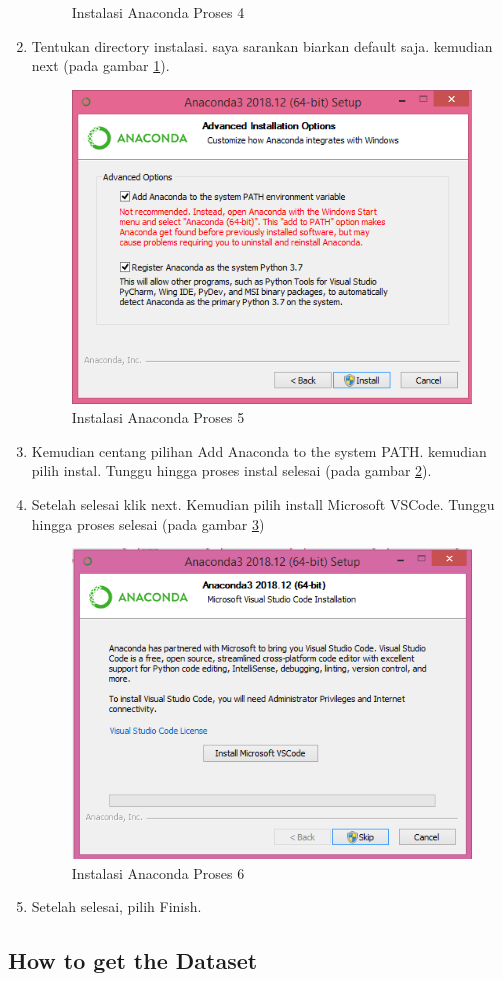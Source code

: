 \begin{enumerate}
\begin{figure}[h!]
	  \caption{Instalasi Anaconda Proses 4}
	  \label{labelgambar5}
	  \end{figure}
  \item Tentukan directory instalasi. saya sarankan biarkan default saja. kemudian next (pada gambar \ref{labelgambar5}).
\begin{figure}[h!]
	  \centering
	  \includegraphics[scale=0.4]{figures/instal/5.PNG}
	  \caption{Instalasi Anaconda Proses 5}
	  \label{labelgambar6}
	  \end{figure}
  \item Kemudian centang pilihan Add Anaconda to the system PATH. kemudian pilih instal. Tunggu hingga proses instal selesai (pada gambar \ref{labelgambar6}).
  \item Setelah selesai klik next. Kemudian pilih install Microsoft VSCode. Tunggu hingga proses selesai (pada gambar \ref{labelgambar7})
      \begin{figure}[h!]
	  \centering
	  \includegraphics[scale=0.4]{figures/instal/8.PNG}
	  \caption{Instalasi Anaconda Proses 6}
	  \label{labelgambar7}
	  \end{figure}
  \item Setelah selesai, pilih Finish. 
  
\end{enumerate}
\subsection{How to get the Dataset}
